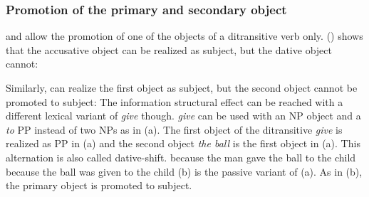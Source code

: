 

\subsubsection{Promotion of the primary and secondary object}

\largerpage
{} and  allow the promotion of one of the objects of a ditransitive verb only. ()
shows that the accusative object can be realized as subject, but the dative object cannot:
\eal
{}
\zl

\noindent
Similarly,  can realize the first object as subject, but the second object cannot be promoted
to subject:
\eal
{}
\zl
The information structural effect can be reached with a different lexical variant of \emph{give}
though. \emph{give} can be used with an NP object and a \emph{to} PP instead of two NPs as in
(a). The first object of the ditransitive \emph{give} is realized as PP in (a) and the
second object \emph{the ball} is the first object in (a). This alternation is also called dative-shift.
\eal
\ex because the man gave the ball to the child
\ex because the ball was given to the child
\zl
(b) is the passive variant of (a). As in (b), the primary object is promoted
to subject.

